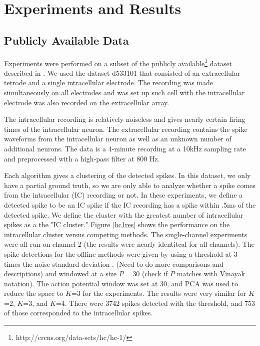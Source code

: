 \documentclass{article} %
\begin{document}
\title{}
\author{}
\date{}
\maketitle
\section{Experiments and Results}
\subsection{Publicly Available Data}
Experiments were performed on a subset of the publicly available\footnote{http://crcns.org/data-sets/hc/hc-1/} dataset described in \cite{Henze2000}.  We used the dataset d533101 that consisted of an extracellular tetrode and a single intracellular electrode.  The recording was made simultaneously on all electrodes and was set up such cell with the intracellular electrode was also recorded on the extracellular array. 

The intracellular recording is relatively noiseless and gives nearly certain firing times of the intracellular neuron.  The extracellular recording contains the spike waveforms from the intracellular neuron as well as an unknown number of additional neurons.  The data is a 4-minute recording at a 10kHz sampling rate and preprocessed with a high-pass filter at 800 Hz.

Each algorithm gives a clustering of the detected spikes.  In this dataset, we only have a partial ground truth, so we are only able to analyze whether a spike comes from the intracellular (IC) recording or not.  In these experiments, we define a detected spike to be an IC spike if the IC recording has a spike within .5ms of the detected spike.  We define the cluster with the greatest number of intracellular spikes as a the "IC cluster."  Figure \ref{hc1res} shows the performance on the intracellular cluster versus competing methods.  The single-channel experiments were all run on channel 2 (the results were nearly identitcal for all channels).  The spike detections for the offline methods were given by using a threshold at 3 times the noise standard deviation \cite{Lewicki}. (Need to do more comparisons and descriptions) and windowed at a size $P=30$ (check if $P$ matches with Vinayak notation).  The action potential window was set at 30, and PCA was used to reduce the space to $K$=3 for the experiments.  The results were very similar for $K$=2, $K$=3, and $K$=4.   There were 3742 spikes detected with the threshold, and 753 of those corresponded to the intracellular spikes.
\end{document}
